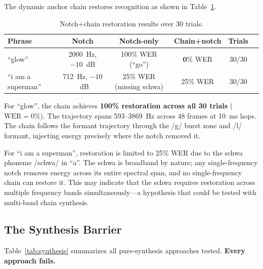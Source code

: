 \documentclass[11pt,a4paper]{article}
\begin{document}
The dynamic anchor chain restores recognition as shown in
Table~\ref{tab:restoration}.

\begin{table}[H]
\centering
\caption{Notch+chain restoration results over 30 trials.}
\label{tab:restoration}
\begin{tabular}{@{}lccccc@{}}
\toprule
\textbf{Phrase} & \textbf{Notch} & \textbf{Notch-only} &
\textbf{Chain+notch} & \textbf{Trials} \\
\midrule
``glow'' & 2000~Hz, $-10$~dB & 100\% WER (``go'') &
$\mathbf{0\%}$ WER & 30/30 \\
``i am a superman'' & 712~Hz, $-10$~dB & 25\% WER (missing schwa) &
25\% WER & 30/30 \\
\bottomrule
\end{tabular}
\end{table}

For ``glow'', the chain achieves \textbf{100\% restoration across all 30 trials}
($\text{WER}=0\%$). The trajectory spans 593--3869~Hz across 48 frames at
10~ms hops. The chain follows the formant trajectory through the /g/ burst zone
and /l/ formant, injecting energy precisely where the notch removed it.

For ``i am a superman'', restoration is limited to 25\% WER due to the schwa
phoneme /{schwa}/ in ``a''. The schwa is broadband by nature; any
single-frequency notch removes energy across its entire spectral span, and no
single-frequency chain can restore it. This may indicate that the schwa requires restoration across
multiple frequency bands simultaneously---a hypothesis that could be tested
with multi-band chain synthesis.

\subsection{The Synthesis Barrier}

Table~\ref{tab:synthesis} summarizes all pure-synthesis approaches tested.
\textbf{Every approach fails.}
\end{document}
